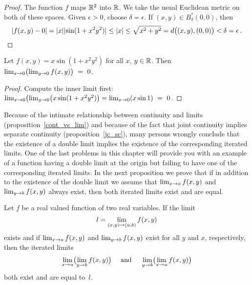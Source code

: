 \begin{proof} The function $f$ maps $\mathbb{R}^2$ into $\mathbb{R}$.  We take the usual Euclidean metric on both
of these spaces.  Given $\epsilon > 0$, choose $\delta = \epsilon$.  If $(x,y) \in
B_\delta^*(0,0)$, then
  \[\lvert f(x,y) - 0\rvert = \lvert x\rvert \lvert\sin(1 + x^2y^2)\rvert  \le \lvert x\rvert \\
         \le \sqrt{x^2 + y^2} = d\bigl((x,y),(0,0)\bigr) <  \delta = \epsilon\,. \qedhere   \]
\end{proof}

\begin{exam} Let $f(x,y) = x\sin(1 + x^2y^2)$ for all $x$, $y \in \mathbb{R}$. Then
$\lim_{x\rightarrow 0}\bigl(\lim_{y \rightarrow 0}f(x,y)\bigr)~=~0$.
\end{exam}

\begin{proof} Compute the inner limit first: $\lim_{x\rightarrow 0}\bigl(\lim_{y \rightarrow 0}
\bigl(x\sin(1+x^2y^2)\bigr) = \lim_{x \rightarrow 0}(x\sin 1)~=~0$.
\end{proof}

Because of the intimate relationship between continuity and limits
(proposition~\ref{cont_vs_lim}) and because of the fact that joint continuity implies separate
continuity (proposition~\ref{jc_sc}), many persons wrongly conclude that the existence of a
double limit implies the existence of the corresponding iterated limits. One of the last
problems in this chapter will provide you with an example of a function having a double limit
at the origin but failing to have one of the corresponding iterated limits.  In the next
proposition we prove that if in addition to the existence of the double limit we assume that
$\lim_{x \rightarrow a}f(x,y)$ and $\lim_{y \rightarrow b}f(x,y)$ always exist, then both iterated limits
exist and are equal.

\begin{prop}\label{dbl_vs_iter}  Let $f$ be a real valued function of two real variables.  If the limit
  \[l = \lim_{(x,y) \rightarrow (a,b)}f(x,y)\]
exists and if $\lim_{x \rightarrow a}f(x,y)$ and $\lim_{y \rightarrow b}f(x,y)$ exist for all $y$ and $x$,
respectively, then the iterated limits
   \[\lim_{x \rightarrow a}\bigl(\lim_{y \rightarrow b}f(x, y)\bigr) \quad \text{
               and } \quad \lim_{y \rightarrow b}\bigl(\lim_{x \rightarrow a}f(x,y)\bigr)\]
both exist and are equal to~$l$.
\end{prop}

